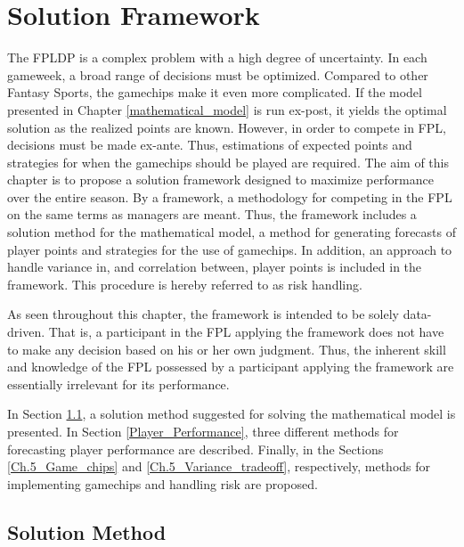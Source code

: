 

\chapter{Solution Framework} \label{chapter_solution_approach}

The FPLDP is a complex problem with a high degree of uncertainty. In each gameweek, a broad range of decisions must be optimized. Compared to other Fantasy Sports, the gamechips make it even more complicated. If the model presented in Chapter \ref{mathematical_model} is run ex-post, it yields the optimal solution as the realized points are known. However, in order to compete in FPL, decisions must be made ex-ante. Thus, estimations of expected points and strategies for when the gamechips should be played are required. The aim of this chapter is to propose a solution framework designed to maximize performance over the entire season. By a framework, a methodology for competing in the FPL on the same terms as managers are meant. Thus, the framework includes a solution method for the mathematical model, a method for generating forecasts of player points and strategies for the use of gamechips. In addition, an approach to handle variance in, and correlation between, player points is included in the framework. This procedure is hereby referred to as risk handling.

\newpar

As seen throughout this chapter, the framework is intended to be solely data-driven. That is, a participant in the FPL applying the framework does not have to make any decision based on his or her own judgment. Thus, the inherent skill and knowledge of the FPL possessed by a participant applying the framework are essentially irrelevant for its performance.

\newpar

In Section \ref{section_solution_method}, a solution method suggested for solving the mathematical model is presented. In Section \ref{Player_Performance}, three different methods for forecasting player performance are described. Finally, in the Sections \ref{Ch.5_Game_chips} and \ref{Ch.5_Variance_tradeoff}, respectively, methods for implementing gamechips and handling risk are proposed.

\newpage 

\section{Solution Method}\label{section_solution_method}

